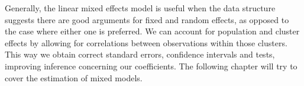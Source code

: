 \documentclass[a4paper,11pt]{article}
\begin{document}
Generally, the linear mixed effects model is useful when the data structure suggests there are good arguments for fixed and random effects, as opposed to the case where either one is preferred. We can account for population and cluster effects by allowing for correlations between observations within those clusters. This way we obtain correct standard errors, confidence intervals and tests, improving inference  concerning our coefficients. The following chapter will try to cover the estimation of mixed models.

 
\end{document}
